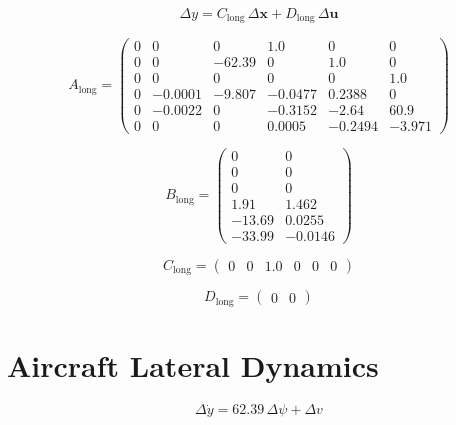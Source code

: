 \documentclass[lettersize,journal]{IEEEtran}
\begin{document}
{\begin{equation}
\Delta y = C_{\mathrm{long}}\,\Delta\bm{x} + D_{\mathrm{long}}\,\Delta\bm{u}
\end{equation}

\begin{equation}
A_{\mathrm{long}}=\left(\begin{array}{cccccc} 0 & 0 & 0 & 1.0 & 0 & 0\\ 0 & 0 & -62.39 & 0 & 1.0 & 0\\ 0 & 0 & 0 & 0 & 0 & 1.0\\ 0 & -0.0001 & -9.807 & -0.0477 & 0.2388 & 0\\ 0 & -0.0022 & 0 & -0.3152 & -2.64 & 60.9\\ 0 & 0 & 0 & 0.0005 & -0.2494 & -3.971 \end{array}\right)
\end{equation}

\begin{equation}
B_{\mathrm{long}}=\left(\begin{array}{cc} 0 & 0\\ 0 & 0\\ 0 & 0\\ 1.91 & 1.462\\ -13.69 & 0.0255\\ -33.99 & -0.0146 \end{array}\right)
\end{equation}

\begin{equation}
C_{\mathrm{long}}=\left(\begin{array}{cccccc} 0 & 0 & 1.0 & 0 & 0 & 0 \end{array}\right)
\end{equation}

\begin{equation}
D_{\mathrm{long}}=\left(\begin{array}{cc} 0 & 0 \end{array}\right)
\end{equation}

\newpage

\section{Aircraft Lateral Dynamics}\label{apdx:lat_dyn}

\begin{equation}
\Delta \dot{y}=62.39\,\Delta \psi +\Delta v
\end{equation}

}
\end{document}
